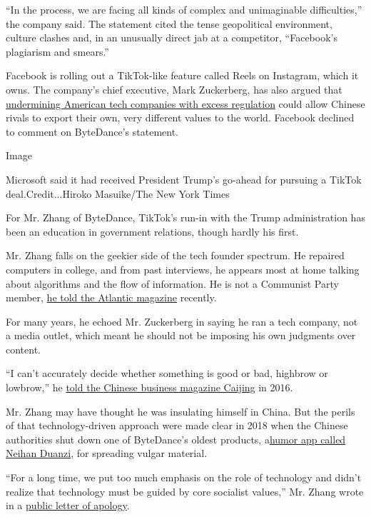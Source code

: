 ``In the process, we are facing all kinds of complex and unimaginable
difficulties,'' the company said. The statement cited the tense
geopolitical environment, culture clashes and, in an unusually direct
jab at a competitor, ``Facebook's plagiarism and smears.''

Facebook is rolling out a TikTok-like feature called Reels on Instagram,
which it owns. The company's chief executive, Mark Zuckerberg, has also
argued that
\href{https://docs.house.gov/meetings/JU/JU05/20200729/110883/HHRG-116-JU05-Wstate-ZuckerbergM-20200729.pdf}{undermining
American tech companies with excess regulation} could allow Chinese
rivals to export their own, very different values to the world. Facebook
declined to comment on ByteDance's statement.

Image

Microsoft said it had received President Trump's go-ahead for pursuing a
TikTok deal.Credit...Hiroko Masuike/The New York Times

For Mr. Zhang of ByteDance, TikTok's run-in with the Trump
administration has been an education in government relations, though
hardly his first.

Mr. Zhang falls on the geekier side of the tech founder spectrum. He
repaired computers in college, and from past interviews, he appears most
at home talking about algorithms and the flow of information. He is not
a Communist Party member,
\href{https://www.theatlantic.com/international/archive/2020/07/tiktok-ban-china-america/614725/}{he
told the Atlantic magazine} recently.

For many years, he echoed Mr. Zuckerberg in saying he ran a tech
company, not a media outlet, which meant he should not be imposing his
own judgments over content.

``I can't accurately decide whether something is good or bad, highbrow
or lowbrow,'' he \href{https://36kr.com/p/1721289883649}{told the
Chinese business magazine Caijing} in 2016.

Mr. Zhang may have thought he was insulating himself in China. But the
perils of that technology-driven approach were made clear in 2018 when
the Chinese authorities shut down one of ByteDance's oldest products,
a\href{https://www.nytimes.com/2018/04/11/technology/china-toutiao-bytedance-censor.html}{humor
app called Neihan Duanzi}, for spreading vulgar material.

``For a long time, we put too much emphasis on the role of technology
and didn't realize that technology must be guided by core socialist
values,'' Mr. Zhang wrote in a
\href{https://mp.weixin.qq.com/s/4r6rCwNE7BgTLD37cPJOoA}{public letter
of apology}.

